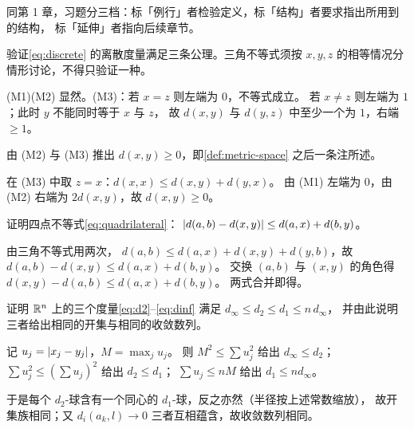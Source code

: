 同第 1 章，习题分三档：标「例行」者检验定义，标「结构」者要求指出所用到的结构，
标「延伸」者指向后续章节。

\begin{exercise}[例行]
  \label{exr:discrete-metric-check}
  验证\cref{eq:discrete} 的离散度量满足三条公理。三角不等式须按
  \(x,y,z\) 的相等情况分情形讨论，不得只验证一种。
  \begin{solution}
    (M1)(M2) 显然。(M3)：若 \(x=z\) 则左端为 \(0\)，不等式成立。
    若 \(x \neq z\) 则左端为 \(1\)；此时 \(y\) 不能同时等于 \(x\) 与 \(z\)，
    故 \(d(x,y)\) 与 \(d(y,z)\) 中至少一个为 \(1\)，右端 \(\ge 1\)。
  \end{solution}
\end{exercise}

\begin{exercise}[例行]
  \label{exr:nonneg}
  由 (M2) 与 (M3) 推出 \(d(x,y) \ge 0\)，即\cref{def:metric-space} 之后一条注所述。
  \begin{solution}
    在 (M3) 中取 \(z = x\)：\(d(x,x) \le d(x,y)+d(y,x)\)。
    由 (M1) 左端为 \(0\)，由 (M2) 右端为 \(2d(x,y)\)，故 \(d(x,y) \ge 0\)。
  \end{solution}
\end{exercise}

\begin{exercise}[例行]
  \label{exr:quadrilateral}
  证明四点不等式\cref{eq:quadrilateral}：
  \(\lvert d(a,b) - d(x,y)\rvert \le d(a,x) + d(b,y)\)。
  \begin{solution}
    由三角不等式用两次，
    \(d(a,b) \le d(a,x)+d(x,y)+d(y,b)\)，故 \(d(a,b)-d(x,y) \le d(a,x)+d(b,y)\)。
    交换 \((a,b)\) 与 \((x,y)\) 的角色得 \(d(x,y)-d(a,b) \le d(a,x)+d(b,y)\)。
    两式合并即得。
  \end{solution}
\end{exercise}

\begin{exercise}[例行]
  \label{exr:equiv-metrics}
  证明 \(\mathbb{R}^{n}\) 上的三个度量\cref{eq:d2}--\cref{eq:dinf} 满足
  \(d_{\infty} \le d_{2} \le d_{1} \le n\, d_{\infty}\)，
  并由此说明三者给出相同的开集与相同的收敛数列。
  \begin{solution}
    记 \(u_{j} = \lvert x_{j}-y_{j}\rvert\)，\(M = \max_{j} u_{j}\)。
    则 \(M^{2} \le \sum u_{j}^{2}\) 给出 \(d_{\infty} \le d_{2}\)；
    \(\sum u_{j}^{2} \le (\sum u_{j})^{2}\) 给出 \(d_{2} \le d_{1}\)；
    \(\sum u_{j} \le nM\) 给出 \(d_{1} \le n d_{\infty}\)。

    于是每个 \(d_{2}\)-球含有一个同心的 \(d_{1}\)-球，反之亦然（半径按上述常数缩放），
    故开集族相同；又 \(d_{i}(a_{k},l) \to 0\) 三者互相蕴含，故收敛数列相同。
  \end{solution}
\end{exercise}

